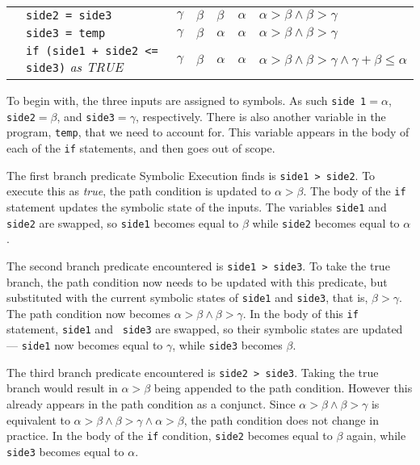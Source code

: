 \begin{center}
{\begin{tabular}{rllllll}
            & {\tt side2 = side3}                              & $\gamma$    & $\beta$     & $\beta$     & $\alpha$   & $\alpha > \beta \wedge \beta > \gamma$ \\
            & {\tt side3 = temp}                               & $\gamma$    & $\beta$     & $\alpha$    & $\alpha$   & $\alpha > \beta \wedge \beta > \gamma$ \\
            & {\tt if (side1 + side2 <= side3)} {\it as TRUE}  & $\gamma$    & $\beta$     & $\alpha$    & $\alpha$   & $\alpha > \beta \wedge \beta > \gamma \wedge \gamma + \beta \leq \alpha$ \\
\bottomrule
\end{tabular}}
\end{center}

To begin with, the three inputs are assigned to symbols. As such {\tt side 1}$ =
\alpha$, {\tt side2}$ = \beta$, and {\tt side3}$ = \gamma$, respectively. There
is also another variable in the program, {\tt temp}, that we need to account
for. This variable appears in the body of each of the {\tt if} statements, and
then goes out of scope. 

The first branch predicate Symbolic Execution finds is {\tt side1 > side2}. To
execute this as {\it true}, the path condition is updated to $\alpha > \beta$.
The body of the {\tt if} statement updates the symbolic state of the inputs. The
variables {\tt side1} and {\tt side2} are swapped, so {\tt side1} becomes equal
to $\beta$ while {\tt side2} becomes equal to $\alpha$. 

The second branch predicate encountered is {\tt side1 > side3}. To take the true
branch, the path condition now needs to be updated with this predicate, but
substituted with the current symbolic states of {\tt side1} and {\tt side3},
that is, $\beta > \gamma$. The path condition now becomes $\alpha > \beta \wedge
\beta > \gamma$. In the body of this {\tt if} statement, {\tt side1} and {\tt
side3} are swapped, so their symbolic states are updated --- {\tt side1} now
becomes equal to $\gamma$, while {\tt side3} becomes $\beta$.

The third branch predicate encountered is {\tt side2 > side3}. Taking the true
branch would result in $\alpha > \beta$ being appended to the path condition.
However this already appears in the path condition as a conjunct. Since $\alpha
> \beta \wedge \beta > \gamma$ is equivalent to $\alpha > \beta \wedge \beta >
\gamma \wedge \alpha > \beta$, the path condition does not change in practice.
In the body of the {\tt if} condition, {\tt side2} becomes equal to $\beta$
again, while {\tt side3} becomes equal to $\alpha$.

